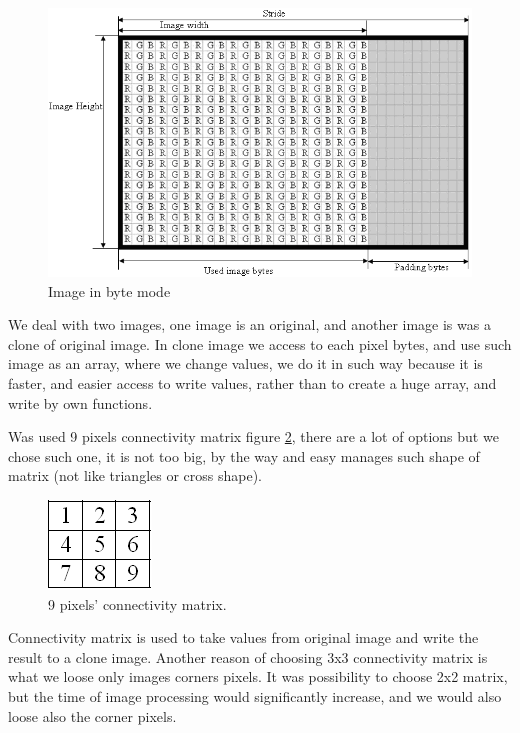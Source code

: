 \begin{figure}[H]
  \centering
  \includegraphics[scale= 0.6]{source/imagebyte.png}
  \caption{Image in byte mode}
  \label{fig:imagebyte}
\end{figure}

We deal with two images, one image is an original, and another image is was a clone of original image. In clone image we access to each pixel bytes, and use such image as an array, where we change values, we do it in such way because it is faster, and easier access to write values, rather than to create a huge array, and write by own functions.

 Was used 9 pixels connectivity matrix figure  \ref{fig:pixelmatrix}, there are a lot of options but we chose such one, it is not too big, by the way and easy manages such shape of matrix (not like triangles or cross shape).  

\begin{figure}[H]
  \centering
  \includegraphics[scale= 0.6]{source/pixelmatrix.png}
  \caption{9 pixels’ connectivity matrix.}
  \label{fig:pixelmatrix}
\end{figure}

Connectivity matrix is used to take values from original image and write the result to a clone image. Another reason of choosing 3x3 connectivity matrix is what we loose only images corners pixels. It was possibility to choose 2x2 matrix, but the time of image processing would significantly increase, and we would also loose also the corner pixels.


